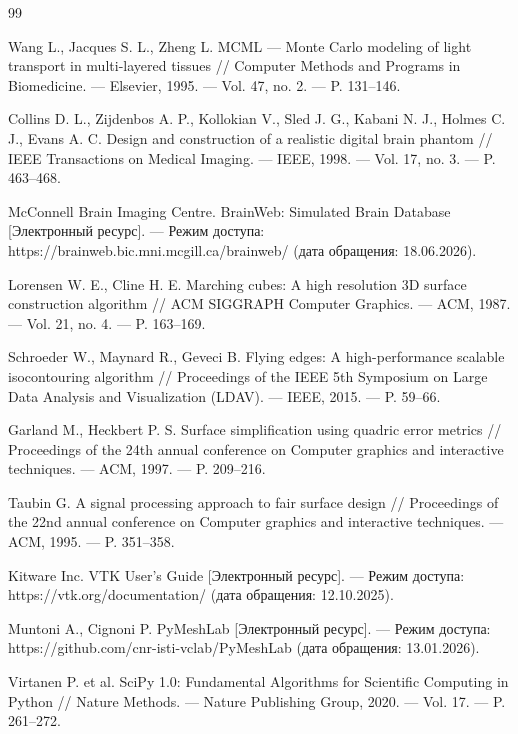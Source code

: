 \documentclass[a4paper,14pt]{article}
\begin{document}
\newpage
\renewcommand{\refname}{Список литературы}
\begin{thebibliography}{99}

Wang L., Jacques S. L., Zheng L. MCML --- Monte Carlo modeling of light transport in multi-layered tissues // Computer Methods and Programs in Biomedicine. --- Elsevier, 1995. --- Vol. 47, no. 2. --- P. 131--146.

Collins D. L., Zijdenbos A. P., Kollokian V., Sled J. G., Kabani N. J., Holmes C. J., Evans A. C. Design and construction of a realistic digital brain phantom // IEEE Transactions on Medical Imaging. --- IEEE, 1998. --- Vol. 17, no. 3. --- P. 463--468.

McConnell Brain Imaging Centre. BrainWeb: Simulated Brain Database [Электронный ресурс]. --- Режим доступа: https://brainweb.bic.mni.mcgill.ca/brainweb/ (дата обращения: 18.06.2026).

Lorensen W. E., Cline H. E. Marching cubes: A high resolution 3D surface construction algorithm // ACM SIGGRAPH Computer Graphics. --- ACM, 1987. --- Vol. 21, no. 4. --- P. 163--169.

Schroeder W., Maynard R., Geveci B. Flying edges: A high-performance scalable isocontouring algorithm // Proceedings of the IEEE 5th Symposium on Large Data Analysis and Visualization (LDAV). --- IEEE, 2015. --- P. 59--66.

Garland M., Heckbert P. S. Surface simplification using quadric error metrics // Proceedings of the 24th annual conference on Computer graphics and interactive techniques. --- ACM, 1997. --- P. 209--216.

Taubin G. A signal processing approach to fair surface design // Proceedings of the 22nd annual conference on Computer graphics and interactive techniques. --- ACM, 1995. --- P. 351--358.

Kitware Inc. VTK User's Guide [Электронный ресурс]. --- Режим доступа: https://vtk.org/documentation/ (дата обращения: 12.10.2025).

Muntoni A., Cignoni P. PyMeshLab [Электронный ресурс]. --- Режим доступа: https://github.com/cnr-isti-vclab/PyMeshLab (дата обращения: 13.01.2026).

Virtanen P. et al. SciPy 1.0: Fundamental Algorithms for Scientific Computing in Python // Nature Methods. --- Nature Publishing Group, 2020. --- Vol. 17. --- P. 261--272.

\end{thebibliography}
\end{document}
